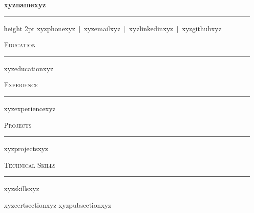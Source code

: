 \documentclass[11pt,letterpaper]{article}
\newcommand{\resumesection}[1]{%
  \vspace{8pt}%
  {\textsc{#1}}%
  \vspace{-4pt}\\%
  \hrule%
  \vspace{4pt}%
}
\begin{document}
{\centering
  {\Huge\bfseries xyznamexyz}\\[6pt]
  \hrule height 2pt
  \vspace{4pt}
  \small xyzphonexyz\ $|$\ xyzemailxyz\ $|$\ xyzlinkedinxyz\ $|$\ xyzgithubxyz\\
}

\vspace{6pt}

\resumesection{Education}
xyzeducationxyz

\resumesection{Experience}
xyzexperiencexyz

\resumesection{Projects}
xyzprojectsxyz

\resumesection{Technical Skills}
\begin{itemize}[leftmargin=1.5em,itemsep=2pt,topsep=3pt]
xyzskillsxyz
\end{itemize}

xyzcertsectionxyz
xyzpubsectionxyz
\end{document}
